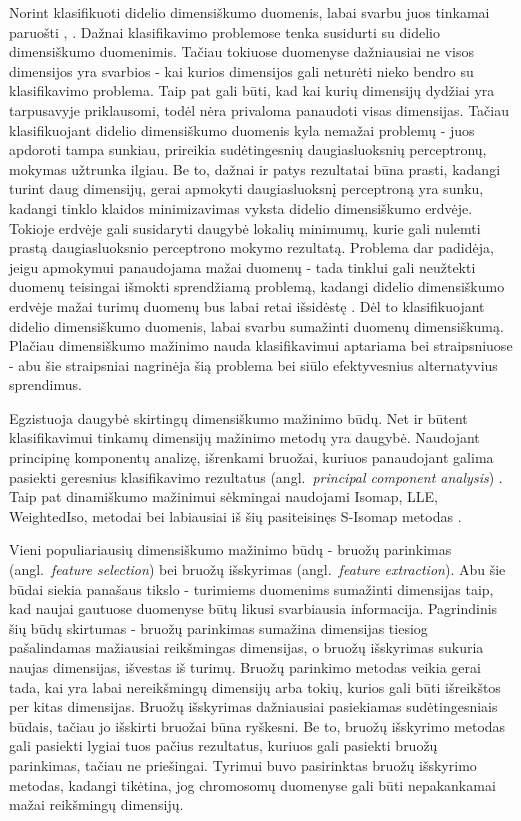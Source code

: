 \documentclass{VUMIFPSbakalaurinis}
\begin{document}
Norint klasifikuoti didelio dimensiškumo duomenis, labai svarbu juos tinkamai paruošti \cite[2455~psl.]{spectra}, \cite[296~psl.]{ann-feature-extraction}.
Dažnai klasifikavimo problemose tenka susidurti su didelio dimensiškumo duomenimis.
Tačiau tokiuose duomenyse dažniausiai ne visos dimensijos yra svarbios - kai kurios dimensijos gali neturėti nieko bendro su klasifikavimo problema.
Taip pat gali būti, kad kai kurių dimensijų dydžiai yra tarpusavyje priklausomi, todėl nėra privaloma panaudoti visas dimensijas.
Tačiau klasifikuojant didelio dimensiškumo duomenis kyla nemažai problemų - juos apdoroti tampa sunkiau, prireikia sudėtingesnių daugiasluoksnių perceptronų, mokymas užtrunka ilgiau.
Be to, dažnai ir patys rezultatai būna prasti, kadangi turint daug dimensijų, gerai apmokyti daugiasluoksnį perceptroną yra sunku, kadangi tinklo klaidos minimizavimas vyksta didelio dimensiškumo erdvėje.
Tokioje erdvėje gali susidaryti daugybė lokalių minimumų, kurie gali nulemti prastą daugiasluoksnio perceptrono mokymo rezultatą.
Problema dar padidėja, jeigu apmokymui panaudojama mažai duomenų - tada tinklui gali neužtekti duomenų teisingai išmokti sprendžiamą problemą, kadangi didelio dimensiškumo erdvėje mažai turimų duomenų bus labai retai išsidėstę \cite[2455~psl.]{spectra}.
Dėl to klasifikuojant didelio dimensiškumo duomenis, labai svarbu sumažinti duomenų dimensiškumą.
Plačiau dimensiškumo mažinimo nauda klasifikavimui aptariama bei straipsniuose - abu šie straipsniai nagrinėja šią problema bei siūlo efektyvesnius alternatyvius sprendimus.

Egzistuoja daugybė skirtingų dimensiškumo mažinimo būdų.
Net ir būtent klasifikavimui tinkamų dimensijų mažinimo metodų yra daugybė.
Naudojant principinę komponentų analizę, išrenkami bruožai, kuriuos panaudojant galima pasiekti geresnius klasifikavimo rezultatus (angl.~\textit{principal component analysis}) \cite[1517~psl.]{pca-classification}.
Taip pat dinamiškumo mažinimui sėkmingai naudojami Isomap, LLE, WeightedIso, metodai bei labiausiai iš šių pasiteisinęs S-Isomap metodas \cite[1098~psl.]{s-isomap-classification}.

Vieni populiariausių dimensiškumo mažinimo būdų - bruožų parinkimas (angl.~\textit{feature selection}) bei bruožų išskyrimas (angl.~\textit{feature extraction}).
Abu šie būdai siekia panašaus tikslo - turimiems duomenims sumažinti dimensijas taip, kad naujai gautuose duomenyse būtų likusi svarbiausia informacija.
Pagrindinis šių būdų skirtumas - bruožų parinkimas sumažina dimensijas tiesiog pašalindamas mažiausiai reikšmingas dimensijas, o bruožų išskyrimas sukuria naujas dimensijas, išvestas iš turimų.
Bruožų parinkimo metodas veikia gerai tada, kai yra labai nereikšmingų dimensijų arba tokių, kurios gali būti išreikštos per kitas dimensijas.
Bruožų išskyrimas dažniausiai pasiekiamas sudėtingesniais būdais, tačiau jo išskirti bruožai būna ryškesni.
Be to, bruožų išskyrimo metodas gali pasiekti lygiai tuos pačius rezultatus, kuriuos gali pasiekti bruožų parinkimas, tačiau ne priešingai.
Tyrimui buvo pasirinktas bruožų išskyrimo metodas, kadangi tikėtina, jog chromosomų duomenyse gali būti nepakankamai mažai reikšmingų dimensijų.
\end{document}
